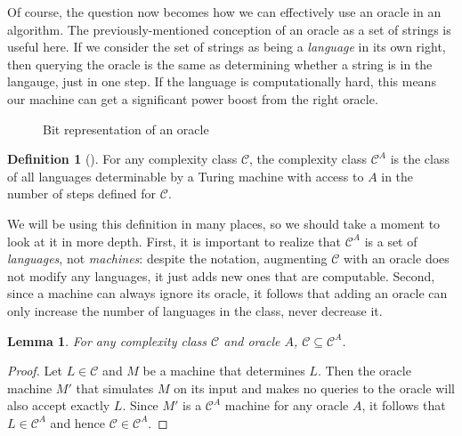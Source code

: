 \documentclass[english,12pt]{reedthesis}
\theoremstyle{plain}
\newtheorem{lemma}[lemma]{Lemma}
\theoremstyle{definition}
\newtheorem{defn}[defn]{Definition}
\theoremstyle{remark}
\begin{document}
Of course, the question now becomes how we can effectively use an oracle in an
algorithm. The previously-mentioned conception of an oracle as a set of strings
is useful here. If we consider the set of strings as being a \emph{language} in
its own right, then querying the oracle is the same as determining whether a
string is in the langauge, just in one step. If the language is computationally
hard, this means our machine can get a significant power boost from the right
oracle.

\begin{figure}[htbp]
  \centering
  \caption{Bit representation of an oracle}\label{fig:oracle-bits}
\end{figure}

\begin{defn}[{\cite[Def.\ 2.1]{AW09}}]\label{def:oracle-class}
  For any complexity class $\mathcal{C}$, the complexity class $\mathcal{C}^{A}$ is the class of all
  languages determinable by a Turing machine with access to $A$ in the number of
  steps defined for $\mathcal{C}$.
\end{defn}

We will be using this definition in many places, so we should take a moment to
look at it in more depth. First, it is important to realize that $\mathcal{C}^{A}$ is a
set of \emph{languages}, not \emph{machines}: despite the notation, augmenting
$\mathcal{C}$ with an oracle does not modify any languages, it just adds new ones that are
computable. Second, since a machine can always ignore its oracle, it follows
that adding an oracle can only increase the number of languages in the class,
never decrease it.

\begin{lemma}\label{thm:relativizing-increases}
  For any complexity class $\mathcal{C}$ and oracle $A$, $\mathcal{C} \subseteq \mathcal{C}^{A}$.
\end{lemma}

\begin{proof}
  Let $L \in \mathcal{C}$ and $M$ be a machine that determines $L$. Then the oracle machine
  $M'$ that simulates $M$ on its input and makes no queries to the oracle will
  also accept exactly $L$. Since $M'$ is a $\mathcal{C}^{A}$ machine for any oracle $A$,
  it follows that $L \in \mathcal{C}^{A}$ and hence $\mathcal{C} \in \mathcal{C}^{A}$.
\end{proof}
\end{document}
